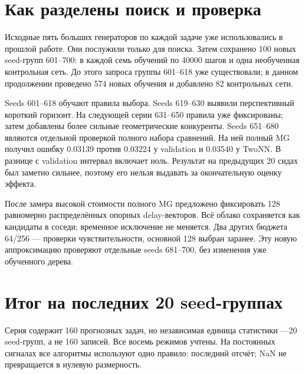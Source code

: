 \documentclass[10pt,a4paper]{article}
\begin{document}
\section*{Как разделены поиск и проверка}

Исходные пять больших генераторов по каждой задаче уже использовались в прошлой работе. Они послужили только для поиска. Затем сохранено 100 новых seed-групп 601--700: в каждой семь обучений по 40000 шагов и одна необученная контрольная сеть. До этого запроса группы 601--618 уже существовали; в данном продолжении проведено 574 новых обучения и добавлено 82 контрольных сети.

Seeds 601--618 обучают правила выбора. Seeds 619--630 выявили перспективный короткий горизонт. На следующей серии 631--650 правила уже фиксированы; затем добавлены более сильные геометрические конкуренты. Seeds 651--680 являются отдельной проверкой полного набора сравнений. На ней полный MG получил ошибку 0.03139 против 0.03224 у validation и 0.03540 у TwoNN. В разнице с validation интервал включает ноль. Результат на предыдущих 20 сидах был заметно сильнее, поэтому его нельзя выдавать за окончательную оценку эффекта.

После замера высокой стоимости полного MG предложено фиксировать 128 равномерно распределённых опорных delay-векторов. Всё облако сохраняется как кандидаты в соседи; временное исключение не меняется. Два других бюджета 64/256 --- проверки чувствительности, основной 128 выбран заранее. Эту новую аппроксимацию проверяют отдельные seeds 681--700, без изменения уже обученного дерева.

\section*{Итог на последних 20 seed-группах}

Серия содержит 160 прогнозных задач, но независимая единица статистики ---20 seed-групп, а не 160 записей. Все восемь режимов учтены. На постоянных сигналах все алгоритмы используют одно правило: последний отсчёт; NaN не превращается в нулевую размерность.
\end{document}
